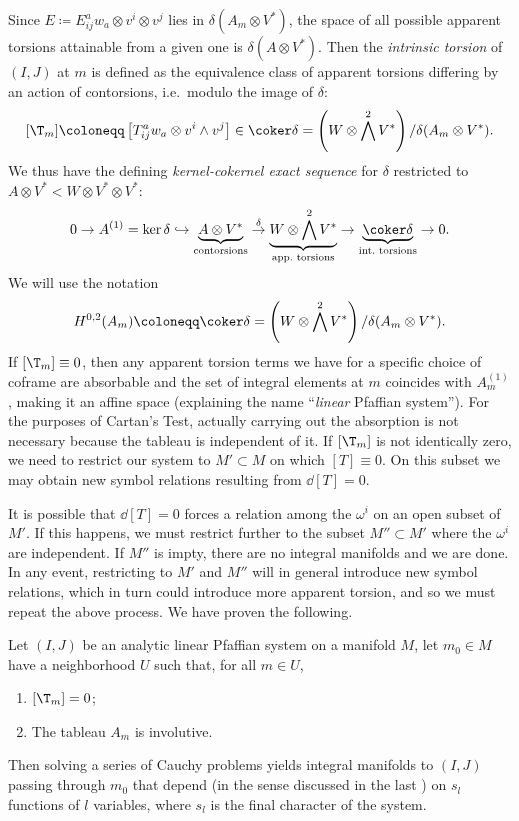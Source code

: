 Since $E\coloneqq E^a_{ij}w_a\otimes v^i\otimes v^j$ lies in $\delta(A_m\otimes V^\ast)$, the space of all possible apparent torsions attainable from a given one is $\delta(A\otimes V^\ast)$. Then the \emph{intrinsic torsion} of $(I,J)$ at $m$ is defined as the equivalence class of apparent torsions differing by an action of contorsions, i.e.\ modulo the image of $\delta$:
\[[\T_m]\coloneqq \left[T^a_{ij}w_a\otimes v^i\wedge v^j\right]\in \coker\delta =\left(W\otimes \bigwedge^2 V^\ast\right)\slash \delta(A_m\otimes V^\ast).\]
We thus have the defining \emph{kernel-cokernel exact sequence} for $\delta$ restricted to $A\otimes V^\ast<W\otimes V^\ast\otimes V^\ast$:
\[0\to A^{(1)}=\ker\delta \hookrightarrow \underbrace{A\otimes V^\ast}_{\text{contorsions}}\overset{\delta}{\to}\underbrace{W\otimes\bigwedge^2 V^\ast}_{\text{app.\ torsions}}\to \underbrace{\coker\delta}_{\text{int.\ torsions}}\to 0.\]
We will use the notation 
\[H^{0,2}(A_m)\coloneqq \coker\delta=\left(W\otimes \bigwedge^2V^\ast\right)\slash \delta(A_m\otimes V^\ast).\]
If $[\T_m]\equiv 0$, then any apparent torsion terms we have for a specific choice of coframe are absorbable and the set of integral elements at $m$ coincides with $A^{(1)}_m$, making it an affine space (explaining the name ``\emph{linear} Pfaffian system''). For the purposes of Cartan's Test, actually carrying out the absorption is not necessary because the tableau is independent of it. If $[\T_m]$ is not identically zero, we need to restrict our system to $M'\subset M$ on which $[T]\equiv 0$. On this subset we may obtain new symbol relations resulting from $\dd [T]=0$.

It is possible that $\dd[T]=0$ forces a relation among the $\omega^i$ on an open subset of $M'$. If this happens, we must restrict further to the subset $M''\subset M'$ where the $\omega^i$ are independent. If $M''$ is impty, there are no integral manifolds and we are done. In any event, restricting to $M'$ and $M''$ will in general introduce new symbol relations, which in turn could introduce more apparent torsion, and so we must repeat the above process. We have proven the following.

\begin{thm}\label{thm 6.5.6 Ivey}
    Let $(I,J)$ be an analytic linear Pfaffian system on a manifold $M$, let $m_0\in M$ have a neighborhood $U$ such that, for all $m\in U$,
    \begin{enumerate}
        \item $[\T_m]=0$;
        \item The tableau $A_m$ is involutive.
    \end{enumerate}
    Then solving a series of Cauchy problems yields integral manifolds to $(I,J)$ passing through $m_0$ that depend (in the sense discussed in the last \subsect) on $s_l$ functions of $l$ variables, where $s_l$ is the final character of the system.
\end{thm}

